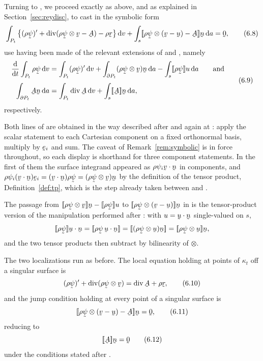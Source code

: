Turning to , we proceed exactly as above, and as explained in
Section~\ref{sec:reydisc}, to cast  in the symbolic form
\begin{equation}
   \int_{P_{t}}\big\{(\rho\vek\psi)'+\dvg(\rho\vek\psi\otimes\bv-\bA)
   -\rho\br\big\}\,\dl v
   +\int_{s}\jump{\rho\vek\psi\otimes(\bv-\bu)-\bA}\bn\,\dl a=\bze ,
   \tag{6.8}\label{eq:6.8}
\end{equation}
use having been made of the relevant extensions of  and
, namely
\begin{equation}
\begin{aligned}
   \frac{\dl}{\dl t}\int_{P_{t}}\rho\vek{\psi}\,\dl v
   &=\int_{P_{t}}(\rho\vek{\psi})'\,\dl v
    +\int_{\partial P_{t}}(\rho\vek{\psi}\otimes\bv)\bn\,\dl a
    -\int_{s}\jump{\rho\vek{\psi}}u\,\dl a
   \qquad\text{and}\\[1mm]
   \int_{\partial P_{t}}\bA\bn\,\dl a
   &=\int_{P_{t}}\dvg\bA\,\dl v+\int_{s}\jump\bA\bn\,\dl a ,
\end{aligned}
   \tag{6.9}\label{eq:6.9}
\end{equation}
respectively.

Both lines of  are obtained in the way described after
 and again at : apply the scalar statement to each
Cartesian component on a fixed orthonormal basis, multiply by $\be_{i}$
and sum. The caveat of Remark~\ref{rem:symbolic} is in force
throughout, so each display is shorthand for three component
statements. In the first of them the surface integrand appeared as
$\rho\psi_{i}\ip\bv\bn$ in components, and
$\rho\psi_{i}(\ip\bv\bn)\be_{i}=(\ip\bv\bn)\rho\vek\psi
=(\rho\vek\psi\otimes\bv)\bn$ by the definition of the tensor product,
Definition~\ref{def:tp}, which is the step already taken between
 and .

The passage from $\jump{\rho\vek\psi\otimes\bv}\bn
-\jump{\rho\vek\psi}u$ to $\jump{\rho\vek\psi\otimes(\bv-\bu)}\bn$ in
 is the tensor-product version of the manipulation performed
after : with $u=\ip\bu\bn$ single-valued on $s$,
\[
   \jump{\rho\vek\psi}\ip\bu\bn
   =\jump{\rho\vek\psi\,\ip\bu\bn}
   =\jump{(\rho\vek\psi\otimes\bu)\bn}
   =\jump{\rho\vek\psi\otimes\bu}\bn ,
\]
and the two tensor products then subtract by bilinearity of $\otimes$.

The two localizations run as before. The local equation holding at
points of $\kappa_{t}$ off a singular surface is
\begin{equation}
   (\rho\vek\psi)'+\dvg(\rho\vek\psi\otimes\bv)=\dvg\bA+\rho\br ,
   \tag{6.10}\label{eq:6.10}
\end{equation}
and the jump condition holding at every point of a singular surface is
\begin{equation}
   \jump{\rho\vek\psi\otimes(\bv-\bu)-\bA}\bn=\bze ,
   \tag{6.11}\label{eq:6.11}
\end{equation}
reducing to
\begin{equation}
   \jump\bA\bn=\bze
   \tag{6.12}\label{eq:6.12}
\end{equation}
under the conditions stated after .


